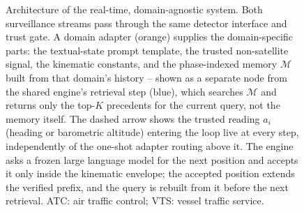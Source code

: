 \begin{figure}[t]
{\begin{tikzpicture}
\end{tikzpicture}%
}
\caption{Architecture of the real-time, domain-agnostic system. Both
surveillance streams pass through the same detector interface and trust
gate. A domain adapter (orange) supplies the domain-specific parts: the
textual-state prompt template, the trusted non-satellite signal, the
kinematic constants, and the phase-indexed memory $\mathcal{M}$ built from
that domain's history -- shown as a separate node from the shared engine's
retrieval step (blue), which searches $\mathcal{M}$ and returns only the
top-$K$ precedents for the current query, not the memory itself. The dashed
arrow shows the trusted reading $a_i$ (heading or barometric altitude)
entering the loop live at every step, independently of the one-shot
adapter routing above it. The engine asks a frozen large language model for
the next position and accepts it only inside the kinematic envelope; the
accepted position extends the verified prefix, and the query is rebuilt
from it before the next retrieval. ATC: air traffic control; VTS: vessel
traffic service.}
\label{fig:architecture}
\end{figure}
